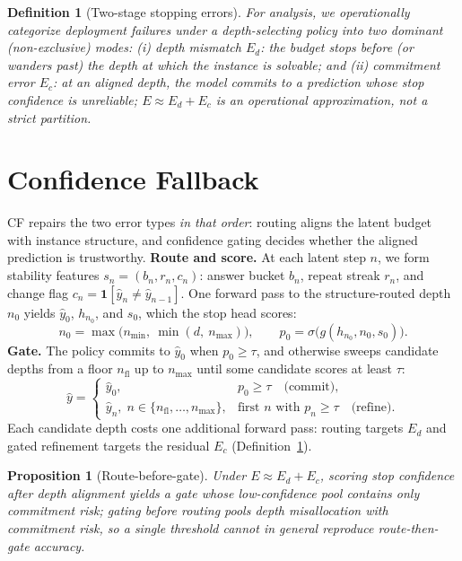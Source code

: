\documentclass{article}
\theoremstyle{compactthm}
\newtheorem{proposition}{Proposition}
\theoremstyle{compactdef}
\newtheorem{definition}{Definition}
\begin{document}
\begin{definition}[Two-stage stopping errors]
\label{def:errors}
For analysis, we operationally categorize deployment failures under a depth-selecting policy into two dominant (non-exclusive) modes: (i) \emph{depth mismatch} $E_d$: the budget stops before (or wanders past) the depth at which the instance is solvable; and (ii) \emph{commitment error} $E_c$: at an aligned depth, the model commits to a prediction whose stop confidence is unreliable; $E \approx E_d + E_c$ is an operational approximation, not a strict partition.
\end{definition}

\section{Confidence Fallback}
\label{sec:method}
CF repairs the two error types \emph{in that order}: routing aligns the latent budget with instance structure, and confidence gating decides whether the aligned prediction is trustworthy. \textbf{Route and score.} At each latent step $n$, we form stability features $s_n=(b_n,r_n,c_n)$: answer bucket $b_n$, repeat streak $r_n$, and change flag $c_n=\mathbf{1}[\hat y_n\ne\hat y_{n-1}]$. One forward pass to the structure-routed depth $n_0$ yields $\hat y_0$, $h_{n_0}$, and $s_0$, which the stop head scores:
\begin{equation}
\label{eq:route}
n_0 = \max\big(n_{\min},\ \min(d,\ n_{\max})\big), \qquad p_0 = \sigma\big(g(h_{n_0}, n_0, s_0)\big).
\end{equation}
\textbf{Gate.} The policy commits to $\hat y_0$ when $p_0 \ge \tau$, and otherwise sweeps candidate depths from a floor $n_{\mathrm{fl}}$ up to $n_{\max}$ until some candidate scores at least $\tau$:
\begin{equation}
\label{eq:policy}
\hat y = \begin{cases} \hat y_0, & p_0 \ge \tau \quad \text{(commit)},\\[1pt] \hat y_{n},\; n \in \{n_{\mathrm{fl}}, \ldots, n_{\max}\}, & \text{first $n$ with } p_n \ge \tau \quad \text{(refine)}. \end{cases}
\end{equation}
Each candidate depth costs one additional forward pass: routing targets $E_d$ and gated refinement targets the residual $E_c$ (Definition~\ref{def:errors}).

\begin{proposition}[Route-before-gate]
\label{prop:order}
Under $E\approx E_d+E_c$, scoring stop confidence after depth alignment yields a gate whose low-confidence pool contains only commitment risk; gating before routing pools depth misallocation with commitment risk, so a single threshold cannot in general reproduce route-then-gate accuracy.
\end{proposition}
\end{document}
